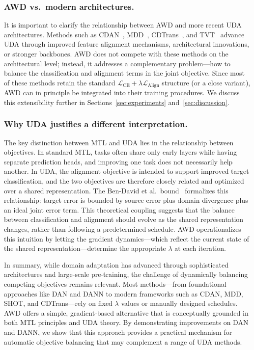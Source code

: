\documentclass[pdflatex,sn-mathphys-num]{sn-jnl}
\theoremstyle{thmstyleone}
\theoremstyle{thmstyletwo}
\theoremstyle{thmstylethree}
\begin{document}
\subsubsection{AWD vs.\ modern architectures.}
It is important to clarify the relationship between AWD and more recent UDA architectures. Methods such as CDAN~\cite{long2018cdan}, MDD~\cite{zhang2019mdd}, CDTrans~\cite{xu2022cdtrans}, and TVT~\cite{yang2023tvt} advance UDA through improved feature alignment mechanisms, architectural innovations, or stronger backbones. AWD does not compete with these methods on the architectural level; instead, it addresses a complementary problem---how to balance the classification and alignment terms in the joint objective. Since most of these methods retain the standard $\mathcal{L}_{\text{CE}} + \lambda \mathcal{L}_{\text{Align}}$ structure (or a close variant), AWD can in principle be integrated into their training procedures. We discuss this extensibility further in Sections~\ref{sec:experiments} and~\ref{sec:discussion}.

\subsubsection{Why UDA justifies a different interpretation.}
The key distinction between MTL and UDA lies in the relationship between objectives. In standard MTL, tasks often share only early layers while having separate prediction heads, and improving one task does not necessarily help another. In UDA, the alignment objective is intended to support improved target classification, and the two objectives are therefore closely related and optimized over a shared representation. The Ben-David et al.\ bound~\cite{bendavid2010theory} formalizes this relationship: target error is bounded by source error plus domain divergence plus an ideal joint error term. This theoretical coupling suggests that the balance between classification and alignment should evolve as the shared representation changes, rather than following a predetermined schedule. AWD operationalizes this intuition by letting the gradient dynamics---which reflect the current state of the shared representation---determine the appropriate $\lambda$ at each iteration.

\vspace{0.5em}
\noindent In summary, while domain adaptation has advanced through sophisticated architectures and large-scale pre-training, the challenge of dynamically balancing competing objectives remains relevant. Most methods---from foundational approaches like DAN and DANN to modern frameworks such as CDAN, MDD, SHOT, and CDTrans---rely on fixed $\lambda$ values or manually designed schedules. AWD offers a simple, gradient-based alternative that is conceptually grounded in both MTL principles and UDA theory. By demonstrating improvements on DAN and DANN, we show that this approach provides a practical mechanism for automatic objective balancing that may complement a range of UDA methods.
\end{document}
